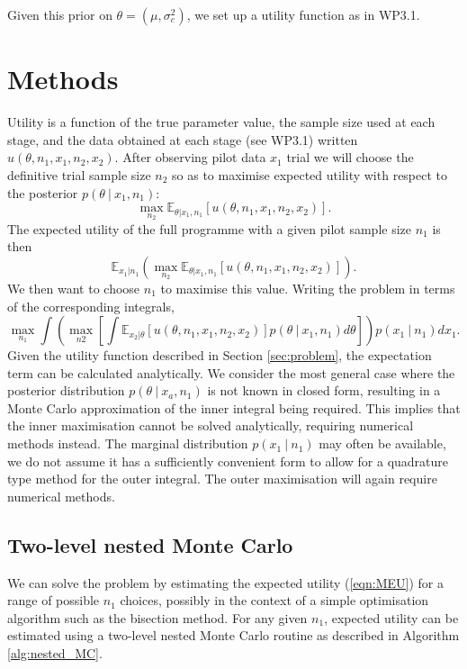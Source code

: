 \documentclass[sagev, Crown]{sagej} %
\begin{document}
Given this prior on $\theta = (\mu, \sigma_c^2)$, we set up a utility function as in WP3.1.

\section{Methods}

Utility is a function of the true parameter value, the sample size used at each stage, and the data obtained at each stage (see WP3.1) written $u(\theta, n_1, x_1, n_2, x_2)$. After observing pilot data $x_1$ trial we will choose the definitive trial sample size $n_2$ so as to maximise expected utility with respect to the posterior $p(\theta ~|~ x_1, n_1)$:
$$
\max_{n_2} \mathbb{E}_{\theta | x_1, n_1}[u(\theta, n_1, x_1, n_2, x_2)].
$$
The expected utility of the full programme with a given pilot sample size $n_1$ is then
\begin{equation}\label{eqn:MEU}
\mathbb{E}_{x_1 | n_1} \left( \max_{n_2} \mathbb{E}_{\theta | x_1, n_1}[u(\theta, n_1, x_1, n_2, x_2)] \right).
\end{equation}
We then want to choose $n_1$ to maximise this value. Writing the problem in terms of the corresponding integrals,
$$
\max_{n_1} \int \left( \max_{n2} \left[ \int \mathbb{E}_{x_2 | \theta}[u(\theta, n_1, x_1, n_2, x_2)] p(\theta ~|~ x_1, n_1) d\theta \right] \right) p(x_1 ~|~ n_1) dx_1.
$$
Given the utility function described in Section \ref{sec:problem}, the expectation term can be calculated analytically. We consider the most general case where the posterior distribution $p(\theta ~|~ x_a, n_1)$ is not known in closed form, resulting in a Monte Carlo approximation of the inner integral being required. This implies that the inner maximisation cannot be solved analytically, requiring numerical methods instead. The marginal distribution $p(x_1 ~|~ n_1)$ may often be available, we do not assume it has a sufficiently convenient form to allow for a quadrature type method for the outer integral. The outer maximisation will again require numerical methods.

\subsection{Two-level nested Monte Carlo}\label{sec:nested_MC}

We can solve the problem by estimating the expected utility (\ref{eqn:MEU}) for a range of possible $n_1$ choices, possibly in the context of a simple optimisation algorithm such as the bisection method. For any given $n_1$, expected utility can be estimated using a two-level nested Monte Carlo routine as described in Algorithm \ref{alg:nested_MC}. 
\end{document}
